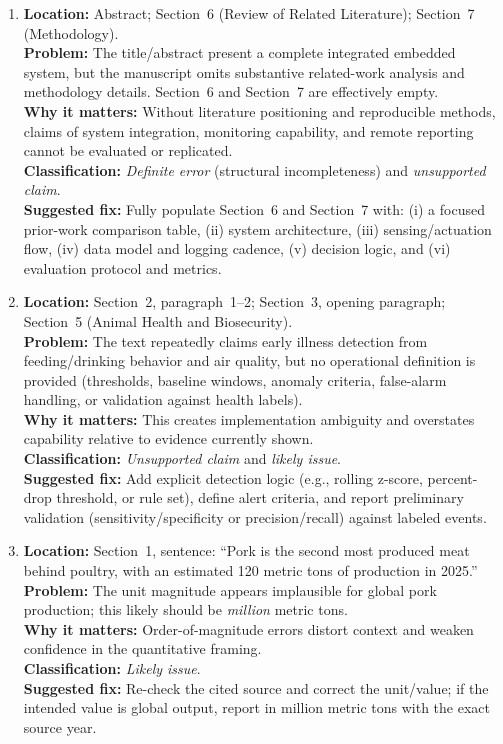 \documentclass[11pt]{article}
\begin{document}
\begin{enumerate}[leftmargin=*]
  \item \textbf{Location:} Abstract; Section~6 (Review of Related Literature); Section~7 (Methodology).\\
        \textbf{Problem:} The title/abstract present a complete integrated embedded system, but the manuscript omits substantive related-work analysis and methodology details. Section~6 and Section~7 are effectively empty.\\
        \textbf{Why it matters:} Without literature positioning and reproducible methods, claims of system integration, monitoring capability, and remote reporting cannot be evaluated or replicated.\\
        \textbf{Classification:} \emph{Definite error} (structural incompleteness) and \emph{unsupported claim}.\\
        \textbf{Suggested fix:} Fully populate Section~6 and Section~7 with: (i) a focused prior-work comparison table, (ii) system architecture, (iii) sensing/actuation flow, (iv) data model and logging cadence, (v) decision logic, and (vi) evaluation protocol and metrics.

  \item \textbf{Location:} Section~2, paragraph~1--2; Section~3, opening paragraph; Section~5 (Animal Health and Biosecurity).\\
        \textbf{Problem:} The text repeatedly claims early illness detection from feeding/drinking behavior and air quality, but no operational definition is provided (thresholds, baseline windows, anomaly criteria, false-alarm handling, or validation against health labels).\\
        \textbf{Why it matters:} This creates implementation ambiguity and overstates capability relative to evidence currently shown.\\
        \textbf{Classification:} \emph{Unsupported claim} and \emph{likely issue}.\\
        \textbf{Suggested fix:} Add explicit detection logic (e.g., rolling z-score, percent-drop threshold, or rule set), define alert criteria, and report preliminary validation (sensitivity/specificity or precision/recall) against labeled events.

  \item \textbf{Location:} Section~1, sentence: ``Pork is the second most produced meat behind poultry, with an estimated 120 metric tons of production in 2025.''\\
        \textbf{Problem:} The unit magnitude appears implausible for global pork production; this likely should be \emph{million} metric tons.\\
        \textbf{Why it matters:} Order-of-magnitude errors distort context and weaken confidence in the quantitative framing.\\
        \textbf{Classification:} \emph{Likely issue}.\\
        \textbf{Suggested fix:} Re-check the cited source and correct the unit/value; if the intended value is global output, report in million metric tons with the exact source year.


\end{enumerate}
\end{document}
